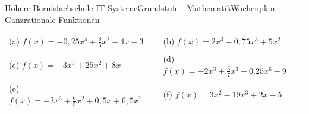 \documentclass[oneside,openany,headings=optiontotoc,11pt,numbers=noenddot]{scrreprt}
\begin{document}
\begin{worksheet}{Höhere Berufsfachschule IT-Systeme}{Grundstufe - Mathematik}{Wochenplan Ganzrationale Funktionen}
\begin{framed}
			\par\noindent
			\begin{tabularx}{\textwidth}{XX}
				(a) \(f(x) = - 0,25x^4 + \frac{8}{3}x^2 - 4x - 3\) & (b) \(f(x) = 2x^3- 0,75x^3 + 5x^2\)\\
				\\
				(c) \(f(x) = -3x^5 + 25x^2 + 8x\) & (d) \(f(x) = -2x^3 + \frac{3}{7}x^3 + 0.25x^6 - 9\)\\
				\\
				(e) \(f(x) = -2x^3 + \frac{6}{5}x^2 + 0,5x + 6,5x^7\) & (f) \(f(x) = 3x^2 -19x^3 + 2x - 5\)\\
			\end{tabularx}
		\end{framed}
	\end{worksheet}
\end{document}
